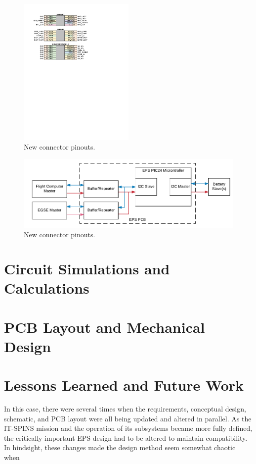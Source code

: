 \begin{figure}[htbp]
	\centering
	\includegraphics[width=0.5\textwidth]{../figs/phoenix/concept/bat_sa_inh_pins.pdf}
	\caption{New connector pinouts.}
	\label{fig:bat_sa_inh_pins}
\end{figure}

\begin{figure}[htbp]
	\centering
	\includegraphics[width=\textwidth]{../figs/phoenix/concept/i2c_tree.pdf}
	\caption{New connector pinouts.}
	\label{fig:i2c_tree}
\end{figure}

\section{Circuit Simulations and Calculations}\label{Sect:eps_calc}



\section{PCB Layout and Mechanical Design}\label{Sect:eps_pcb}



\section{Lessons Learned and Future Work}\label{Sect:eps_results}

In this case, there were several times when the requirements, conceptual design, schematic, and PCB layout were all being updated and altered in parallel. As the IT-SPINS mission and the operation of its subsystems became more fully defined, the critically important EPS design had to be altered to maintain compatibility. In hindsight, these changes made the design method seem somewhat chaotic when 
